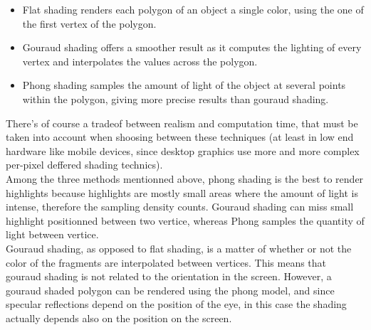 \begin{itemize}
    \item Flat shading renders each polygon of an object a single color, using
    the one of the first vertex of the polygon.
    \item Gouraud shading offers a smoother result as it computes the lighting of
    every vertex and interpolates the values across the polygon.
    \item Phong shading samples the amount of light of the object at several points
    within the polygon, giving more precise results than gouraud shading.
\end{itemize}
There's of course a tradeof between realism and computation time, that must be taken
into account when shoosing between these techniques (at least in low end hardware
like mobile devices, since desktop graphics use more and more complex per-pixel deffered
shading technics).\\
Among the three methods mentionned above, phong shading is the best to render highlights
because highlights are mostly small areas where the amount of light is intense,
therefore the sampling density counts. Gouraud shading can miss small highlight
positionned between two vertice, whereas Phong samples the quantity of light between
vertice. \\
Gouraud shading, as opposed to flat shading, is a matter of whether or not the color of the fragments
are interpolated between vertices. This means that gouraud shading is not related to the orientation in the screen.
However, a gouraud shaded polygon can be rendered using the phong model, and since specular reflections depend on 
the position of the eye, in this case the shading actually depends also on the position on the screen.

